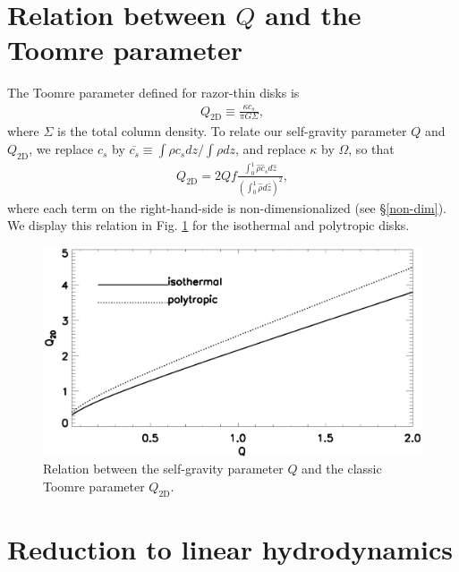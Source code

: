 \section{Relation between $Q$ and the Toomre parameter}\label{q3d2d}
The Toomre parameter defined for razor-thin disks is 
\begin{align}
  Q_\mathrm{2D}\equiv \frac{\kappa c_s}{\pi G\Sigma},  
\end{align}
where $\Sigma$ is the total column density. To relate our
self-gravity parameter $Q$ and $Q_\mathrm{2D}$, we replace $c_s$ by
$\overline{c_s}\equiv\int\rho c_s dz/\int\rho dz$, and replace
$\kappa$ by $\Omega$, so that 
\begin{align}
  Q_\mathrm{2D} = 2Qf \frac{\int_0^1
    \hat{\rho} \hat{c}_s
    d\hat{z}}{\left(\int_0^1 \hat{\rho} d\hat{z}\right)^2},   
\end{align}
where each term on the right-hand-side is non-dimensionalized (see
\S\ref{non-dim}). We display this relation in Fig. \ref{plot_q3d2d}
for the isothermal and polytropic disks.  

\begin{figure}
  \includegraphics[width=\linewidth]{figures/q2d_iso}
  \caption{Relation between the self-gravity parameter $Q$ and the
    classic Toomre parameter $Q_\mathrm{2D}$.   
    \label{plot_q3d2d}}
\end{figure}


\section{Reduction to linear hydrodynamics}\label{reduction} 


